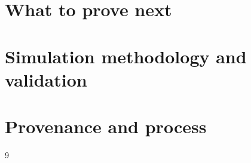 \documentclass[11pt]{article}
\theoremstyle{remark}
\begin{document}
\section{What to prove next}

\appendix
\section{Simulation methodology and validation}
\section{Provenance and process}

\begin{thebibliography}{9}
\end{thebibliography}
\end{document}
